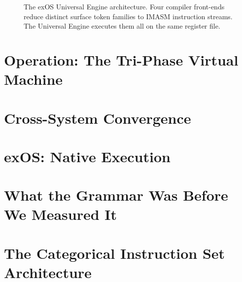 \documentclass[12pt,a4paper]{article}
\begin{document}
\begin{figure}[htbp]
\caption{The exOS Universal Engine architecture. Four compiler front-ends reduce distinct surface token families to IMASM instruction streams. The Universal Engine executes them all on the same register file.}
\label{fig:exos}
\end{figure}


\section{Operation: The Tri-Phase Virtual Machine}
\label{sec:operation}

\section{Cross-System Convergence}
\label{sec:convergence}

\section{exOS: Native Execution}
\label{sec:exos}

\section{What the Grammar Was Before We Measured It}
\label{sec:conclusion}

\section{The Categorical Instruction Set Architecture}
\label{sec:cisa}
\end{document}

